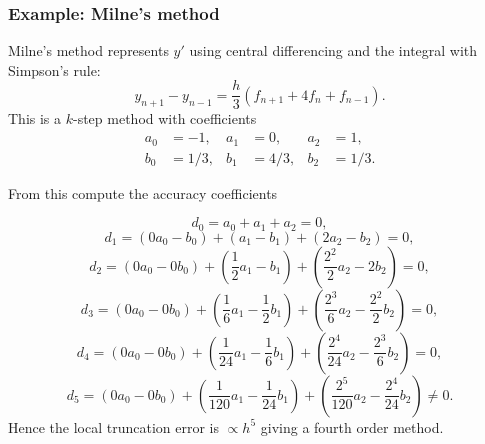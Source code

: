 \documentclass{beamer}
\begin{document}
\begin{frame}
  \frametitle{Example: Milne's method}

  Milne's method represents $y'$ using central differencing and the
  integral with Simpson's rule:
  \begin{equation*}
    y_{n+1} - y_{n-1} = \frac{h}{3} \left( f_{n+1} + 4 f_{n} + f_{n-1} \right).
  \end{equation*} \pause
  This is a $k$-step method with coefficients
  \begin{align*}
    a_0 & = -1, & a_1 & = 0, & a_2 & = 1, \\
    b_0 & = 1/3, & b_1 & = 4/3, & b_2 & = 1/3.
  \end{align*} \pause

  \vspace{1ex}

  From this compute the accuracy coefficients
  \begin{overlayarea}{\textwidth}{0.25\textheight}
    {
      \begin{equation*}
        d_0 = a_0 + a_1 + a_2 = 0,
      \end{equation*}
    }
    {
      \begin{equation*}
        d_1 = (0 a_0 - b_0) + (a_1 - b_1) + (2 a_2 - b_2) = 0,
      \end{equation*}
    }
    {
      \begin{equation*}
        d_2 = (0 a_0 - 0 b_0) + (\frac{1}{2} a_1 - b_1) +
        (\frac{2^2}{2} a_2 - 2 b_2) = 0,
      \end{equation*}
    }
    {
      \begin{equation*}
        d_3 = (0 a_0 - 0 b_0) + (\frac{1}{6} a_1 - \frac{1}{2} b_1) +
        (\frac{2^3}{6} a_2 - \frac{2^2}{2} b_2) = 0,
      \end{equation*}
    }
    {
      \begin{equation*}
        d_4 = (0 a_0 - 0 b_0) + (\frac{1}{24} a_1 - \frac{1}{6} b_1) +
        (\frac{2^4}{24} a_2 - \frac{2^3}{6} b_2) = 0,
      \end{equation*}
    }
    {
      \begin{equation*}
        d_5 = (0 a_0 - 0 b_0) + (\frac{1}{120} a_1 - \frac{1}{24} b_1) +
        (\frac{2^5}{120} a_2 - \frac{2^4}{24} b_2) \neq 0.
      \end{equation*}
    }
    {
      Hence the local truncation error is $\propto h^5$ giving a
      fourth order method.
    }
  \end{overlayarea}
\end{frame}
\end{document}
